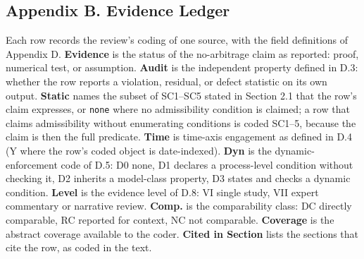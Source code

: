 \documentclass[11pt]{article}
\begin{document}
\subsection*{Appendix B. Evidence Ledger}
Each row records the review's coding of one source, with the field definitions of Appendix D. \textbf{Evidence} is the status of the no-arbitrage claim as reported: proof, numerical test, or assumption. \textbf{Audit} is the independent property defined in D.3: whether the row reports a violation, residual, or defect statistic on its own output. \textbf{Static} names the subset of SC1–SC5 stated in Section 2.1 that the row's claim expresses, or \texttt{none} where no admissibility condition is claimed; a row that claims admissibility without enumerating conditions is coded SC1–5, because the claim is then the full predicate. \textbf{Time} is time-axis engagement as defined in D.4 (Y where the row's coded object is date-indexed). \textbf{Dyn} is the dynamic-enforcement code of D.5: D0 none, D1 declares a process-level condition without checking it, D2 inherits a model-class property, D3 states and checks a dynamic condition. \textbf{Level} is the evidence level of D.8: VI single study, VII expert commentary or narrative review. \textbf{Comp.} is the comparability class: DC directly comparable, RC reported for context, NC not comparable. \textbf{Coverage} is the abstract coverage available to the coder. \textbf{Cited in Section} lists the sections that cite the row, as coded in the text.
\end{document}
